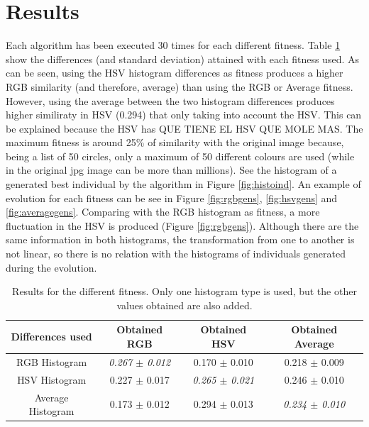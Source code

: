 \documentclass[conference]{IEEEtran}
\begin{document}
\section{Results} 
\label{sec:results}

Each algorithm has been executed 30 times for each different fitness. Table \ref{tab:results} show the differences (and standard deviation) attained with each fitness used. As can be seen, using the HSV histogram differences as fitness produces a higher RGB similarity (and therefore, average) than using the RGB or Average fitness. However, using the average between the two histogram differences produces higher similiraty in HSV (0.294) that only taking into account the HSV. This can be explained because the HSV has QUE TIENE EL HSV QUE MOLE MAS. The maximum fitness is around 25\% of similarity with the original image because, being a list of 50 circles, only a maximum of 50 different colours are used (while in the original jpg image can be more than millions). See the histogram of a generated best individual by the algorithm in Figure \ref{fig:histoind}. An example of evolution for each fitness can be see in Figure \ref{fig:rgbgens}, \ref{fig:hsvgens} and \ref{fig:averagegens}. Comparing with the RGB histogram as fitness, a more fluctuation in the HSV is produced (Figure \ref{fig:rgbgens}). Although there are the same information in both histograms, the transformation from one to another is not linear, so there is no relation with the histograms of individuals generated during the evolution.

\begin{table}
\centering
\caption{Results for the different fitness. Only one histogram type is used, but the other values obtained are also added.}
\begin{tabular}{|c|c|c|c|} \hline
Differences used & Obtained RGB      		& Obtained HSV  & Obtained Average \\ \hline
RGB Histogram    & {\em 0.267 $\pm$ 0.012}	& 0.170 $\pm$ 0.010 	& 0.218 $\pm$ 0.009	\\ \hline
HSV Histogram    & 0.227 $\pm$ 0.017	& {\em 0.265 $\pm$ 0.021}	& 0.246 $\pm$ 0.010 \\ \hline
Average Histogram& 0.173 $\pm$ 0.012	& 0.294 $\pm$ 0.013	& {\em 0.234 $\pm$ 0.010} \\ \hline
\end{tabular}
\label{tab:results}
\end{table}
\end{document}
